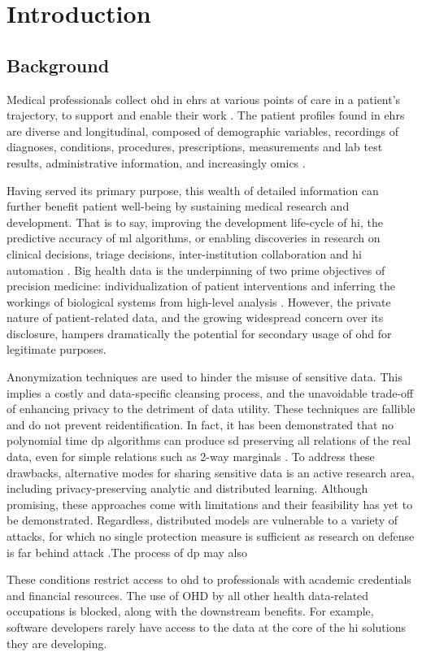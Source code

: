 \glsresetall
\section{Introduction}
    \subsection{Background}
        Medical professionals collect \gls{ohd} in \glspl{ehr} at various points of care in a patient’s trajectory, to support and enable their work \cite{Cowie_2016}. The patient profiles found in \glspl{ehr} are diverse and longitudinal, composed of demographic variables, recordings of diagnoses, conditions, procedures, prescriptions, measurements and lab test results, administrative information, and increasingly omics \cite{Ohdsi2020-vf}.\par
        Having served its primary purpose, this wealth of detailed information can further benefit patient well-being by sustaining medical research and development. That is to say, improving the development life-cycle of \gls{hi}, the predictive accuracy of \gls{ml} algorithms, or enabling discoveries in research on clinical decisions, triage decisions, inter-institution collaboration and \gls{hi} automation \cite{Rudin_2020}. Big health data is the underpinning of two prime objectives of precision medicine: individualization of patient interventions and inferring the workings of biological systems from high-level analysis \cite{Capobianco2020}. However, the private nature of patient-related data, and the growing widespread concern over its disclosure, hampers dramatically the potential for secondary usage of \gls{ohd} for legitimate purposes.\par
        
        Anonymization techniques are used to hinder the misuse of sensitive data. This implies a costly and data-specific cleansing process, and the unavoidable trade-off of enhancing privacy to the detriment of data utility.  These techniques are fallible and do not prevent reidentification. In fact, it has been demonstrated that no polynomial time \gls{dp} algorithms can produce \gls{sd} preserving all relations of the real data, even for simple relations such as 2-way marginals \cite{Ullman2011}. To address these drawbacks, alternative modes for sharing sensitive data is an active research area, including privacy-preserving analytic and distributed learning. Although promising, these approaches come with limitations and their feasibility has yet to be demonstrated. Regardless, distributed models are vulnerable to a variety of attacks, for which no single protection measure is sufficient as research on defense is far behind attack \cite{enthoven2020overview, Gao2020}.The process of \gls{dp} may also \par
        These conditions restrict access to \gls{ohd} to professionals with academic credentials and financial resources. The use of OHD by all other health data-related occupations is blocked, along with the downstream benefits. For example, software developers rarely have access to the data at the core of the \gls{hi} solutions they are developing.
        
